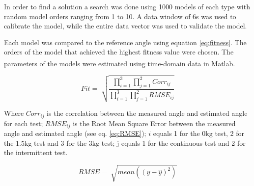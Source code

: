 \documentclass[letterpaper, 10 pt, conference]{ieeeconf}  %
\begin{document}
In order to find a solution a search was done using 1000 models of each type with random model orders ranging from 1 to 10. A data window of 6s was used to calibrate the model, while the entire data vector was used to validate the model.

Each model was compared to the reference angle using equation \ref{eq:fitness}. The orders of the model that achieved the highest fitness value were chosen. The parameters of the models were estimated using time-domain data in Matlab\textsuperscript{\textregistered}.


\begin{equation}
\label{eq:fitness}
Fit = \sqrt[]{\frac{\prod_{i=1}^{3}\prod_{j=1}^{2} Corr_{ij}}{\prod_{i=1}^{3}\prod_{j=1}^{2} RMSE_{ij}}}
\end{equation}

% 
% 

% 
% 


Where $Corr_{ij}$ is the correlation between the measured angle and estimated angle for each test; $RMSE_{ij}$ is the Root Mean Square Error between the measured angle and estimated angle (see eq. \ref{eq:RMSE}); $i$ equals 1 for the 0kg test, 2 for the 1.5kg test and 3 for the 3kg test; j equals 1 for the continuous test and 2 for the intermittent test.

\begin{equation}
\label{eq:RMSE}
RMSE = \sqrt[]{mean((y-\hat{y})^2)}
\end{equation}

\end{document}
